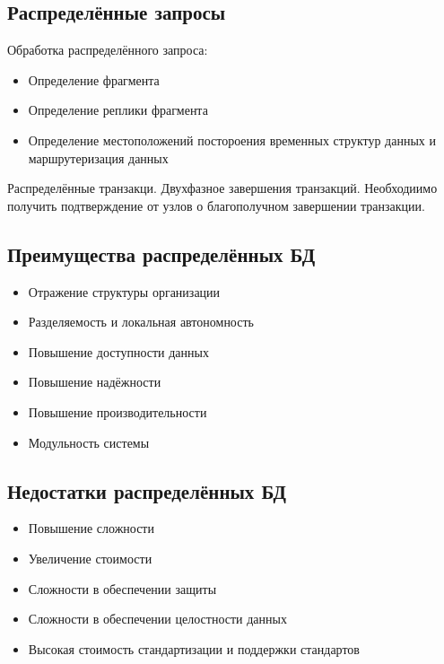 \documentclass{article}
\begin{document}
\subsection{Распределённые запросы}
Обработка распределённого запроса:
\begin{itemize}
    \item Определение фрагмента
    \item Определение реплики фрагмента
    \item Определение местоположений постороения временных структур данных и маршрутеризация данных
\end{itemize}

Распределённые транзакци. Двухфазное завершения транзакций.
\newline Необходиимо получить подтверждение от узлов о благополучном завершении транзакции.

\subsection{Преимущества распределённых БД}

\begin{itemize}
    \item Отражение структуры организации
    \item Разделяемость и локальная автономность
    \item Повышение доступности данных
    \item Повышение надёжности
    \item Повышение производительности
    \item Модульность системы
\end{itemize}

\subsection{Недостатки распределённых БД}

\begin{itemize}
    \item Повышение сложности
    \item Увеличение стоимости
    \item Сложности в обеспечении защиты
    \item Сложности в обеспечении целостности данных
    \item Высокая стоимость стандартизации и поддержки стандартов
\end{itemize}
\end{document}
